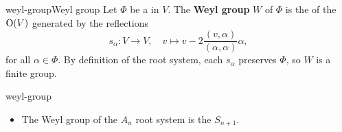 \begin{topic}{weyl-group}{Weyl group}
    Let $\Phi$ be a  in $V$. The \textbf{Weyl group} $W$ of $\Phi$ is the  of the  $\textup{O}(V)$ generated by the reflections
    \[ s_\alpha : V \to V, \quad v \mapsto v - 2 \frac{(v, \alpha)}{(\alpha, \alpha)} \alpha , \]
    for all $\alpha \in \Phi$. By definition of the root system, each $s_\alpha$ preserves $\Phi$, so $W$ is a finite group.
\end{topic}

\begin{example}{weyl-group}
    \begin{itemize}
        \item The Weyl group of the $A_n$ root system is the  $S_{n + 1}$.
    \end{itemize}
\end{example}
